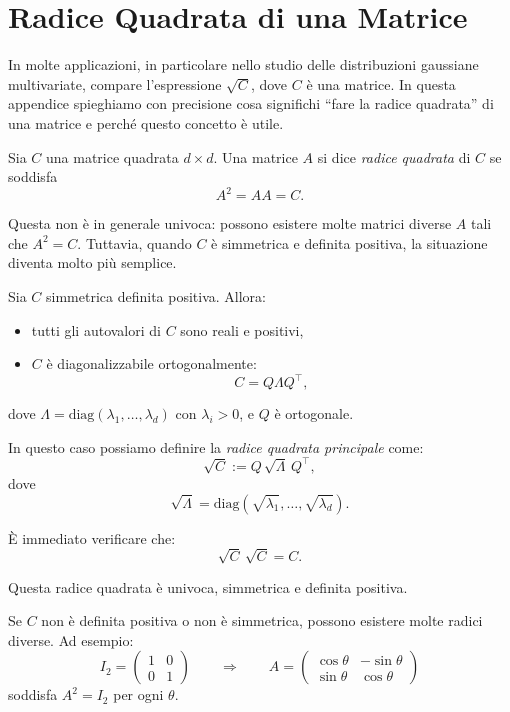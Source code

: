 \section{Radice Quadrata di una Matrice}

In molte applicazioni, in particolare nello studio delle distribuzioni gaussiane
multivariate, compare l’espressione $\sqrt{C}$, dove $C$ è una matrice. In 
questa appendice spieghiamo con precisione cosa significhi ``fare la radice
quadrata'' di una matrice e perché questo concetto è utile.

\begin{definizione}
    Sia $C$ una matrice quadrata $d\times d$. Una matrice $A$ si dice 
\textit{radice quadrata} di $C$ se soddisfa
\[
A^2 = A A = C.
\]
\end{definizione}


Questa non è in generale univoca: possono esistere molte matrici diverse $A$
tali che $A^2=C$. Tuttavia, quando $C$ è simmetrica e definita positiva, la
situazione diventa molto più semplice.

\bigskip
\noindent Sia $C$ simmetrica definita positiva. Allora:

\begin{itemize}
    \item tutti gli autovalori di $C$ sono reali e positivi,
    \item $C$ è diagonalizzabile ortogonalmente: 
    \[
    C = Q \Lambda Q^\top,
    \]
\end{itemize}
dove $\Lambda=\mathrm{diag}(\lambda_1,\dots,\lambda_d)$ con $\lambda_i>0$, e $Q$ è ortogonale.

\begin{definizione}
    In questo caso possiamo definire la \textit{radice quadrata principale} come:
\[
\sqrt{C} := Q\,\sqrt{\Lambda}\,Q^\top,
\]
dove 
\[
\sqrt{\Lambda} = \mathrm{diag}(\sqrt{\lambda_1},\dots,\sqrt{\lambda_d}).
\]
\end{definizione}
\noindent È immediato verificare che:
\[
\sqrt{C}\,\sqrt{C} = C.
\]

\noindent Questa radice quadrata è univoca, simmetrica e definita positiva.

\bigskip
\noindent Se $C$ non è definita positiva o non è simmetrica, possono esistere molte
radici diverse. Ad esempio:
\[
I_2 = 
\begin{pmatrix}
1 & 0 \\ 0 & 1
\end{pmatrix}
\qquad\Rightarrow\qquad
A = 
\begin{pmatrix}
\cos\theta & -\sin\theta \\
\sin\theta & \cos\theta
\end{pmatrix}
\]
soddisfa $A^2 = I_2$ per ogni $\theta$.